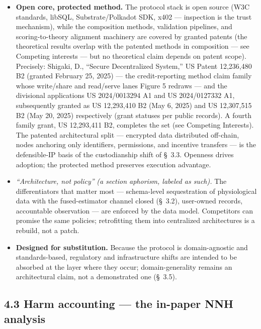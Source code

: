 \documentclass[
]{article}
\begin{document}
\begin{itemize}
\item
  \textbf{Open core, protected method.} The protocol stack is open
  source (W3C standards, libSQL, Substrate/Polkadot SDK, x402 ---
  inspection is the trust mechanism), while the composition methods,
  validation pipelines, and scoring-to-theory alignment machinery are
  covered by granted patents (the theoretical results overlap with the
  patented methods in composition --- see Competing interests --- but no
  theoretical claim depends on patent scope). Precisely: Shigaki, D.,
  ``Secure Decentralized System,'' US Patent 12,236,480 B2 (granted
  February 25, 2025) --- the credit-reporting method claim family whose
  write/share and read/serve lanes Figure 5 redraws --- and the
  divisional applications US 2024/0013294 A1 and US 2024/0127332 A1,
  subsequently granted as US 12,293,410 B2 (May 6, 2025) and US
  12,307,515 B2 (May 20, 2025) respectively (grant statuses per public
  records). A fourth family grant, US 12,293,411 B2, completes the set
  (see Competing Interests). The patented architectural split ---
  encrypted data distributed off-chain, nodes anchoring only
  identifiers, permissions, and incentive transfers --- is the
  defensible-IP basis of the custodianship shift of §~3.3. Openness
  drives adoption; the protected method preserves execution advantage.
\item
  \emph{``Architecture, not policy''} \emph{(a section aphorism, labeled
  as such).} The differentiators that matter most --- schema-level
  sequestration of physiological data with the fused-estimator channel
  closed (§~3.2), user-owned records, accountable observation --- are
  enforced by the data model. Competitors can promise the same policies;
  retrofitting them into centralized architectures is a rebuild, not a
  patch.
\item
  \textbf{Designed for substitution.} Because the protocol is
  domain-agnostic and standards-based, regulatory and infrastructure
  shifts are intended to be absorbed at the layer where they occur;
  domain-generality remains an architectural claim, not a demonstrated
  one (§~3.5).
\end{itemize}

\subsection{4.3 Harm accounting --- the in-paper NNH
analysis}\label{harm-accounting-the-in-paper-nnh-analysis}
\end{document}
